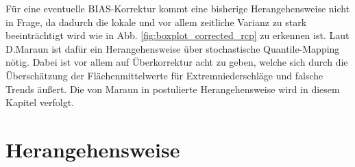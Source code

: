Für eine eventuelle BIAS-Korrektur kommt eine bisherige Herangehensweise nicht in Frage, da dadurch die lokale und vor allem zeitliche Varianz zu stark beeinträchtigt wird wie in Abb. \ref{fig:boxplot_corrected_rcp} zu erkennen ist. Laut D.Maraun \cite{biasMaraun} ist dafür ein Herangehensweise über stochastische Quantile-Mapping nötig. Dabei ist vor allem auf Überkorrektur acht zu geben, welche sich durch die Überschätzung der Flächenmittelwerte für Extremniederschläge und falsche Trends äußert. Die von Maraun in \cite{biasMaraun} postulierte Herangehensweise wird in diesem Kapitel verfolgt.
\section{Herangehensweise}
